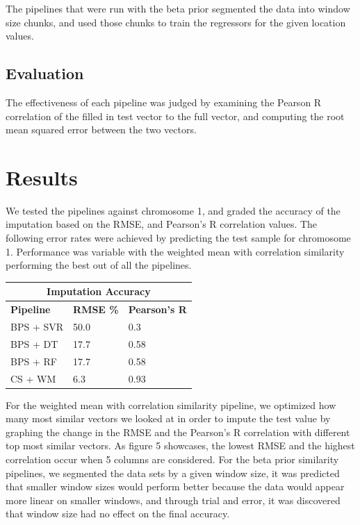 \documentclass{article} %
\begin{document}
The pipelines that were run with the beta prior segmented the data into window size chunks, and used those chunks to train the regressors for the given location values.

\subsection{Evaluation}
The effectiveness of each pipeline was judged by examining the Pearson R correlation of the filled in test vector to the full vector, and computing the root mean squared error between the two vectors.

\section{Results}
We tested the pipelines against chromosome 1, and graded the accuracy of the imputation based on the RMSE, and Pearson's R correlation values. The following error rates were achieved by predicting the test sample for chromosome 1. Performance was variable with the weighted mean with correlation similarity performing the best out of all the pipelines.
\begin{center}
	\begin{tabular}{ |p{2cm}|p{2.3cm}|p{2.3cm}|}
		\hline
		\multicolumn{3}{|c|}{\textbf{Imputation Accuracy}} \\
		\hline
		\textbf{Pipeline} & \textbf{RMSE \%} & \textbf{Pearson's R} \\
		\hline
		BPS + SVR & 50.0 & 0.3 \\
		BPS + DT & 17.7  & 0.58 \\
		BPS + RF & 17.7 & 0.58 \\
		CS + WM & 6.3 & 0.93 \\
		\hline
	\end{tabular}
\end{center}

For the weighted mean with correlation similarity pipeline, we optimized how many most similar vectors we looked at in order to impute the test value by graphing the change in the RMSE and the Pearson's R correlation with different top most similar vectors. As figure 5 showcases, the lowest RMSE and the highest correlation occur when 5 columns are considered. For the beta prior similarity pipelines, we segmented the data sets by a given window size, it was predicted that smaller window sizes would perform better because the data would appear more linear on smaller windows, and through trial and error, it was discovered that window size had no effect on the final accuracy.
\end{document}
